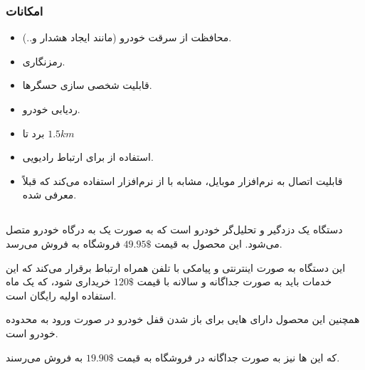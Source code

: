 \documentclass[a4paper,12pt]{report}
\begin{document}
	\subsubsection{
		امکانات
	}\label{subsubsec1:subsec2:sec3:chap1}
	\begin{itemize}[nosep]\label{item1:subsec2:sec3:chap1}
		\item
		محافظت از سرقت خودرو (مانند ایجاد هشدار و..).
		\item
		رمزنگاری.
		\item
		قابلیت شخصی سازی حسگر‌ها.
		\item
		ردیابی خودرو.
		\item
		برد
		تا
		$1.5 km$
		\item
		استفاده از
		برای ارتباط رادیویی.
		\item
		قابلیت اتصال به نرم‌افزار موبایل، مشابه با
		از نرم‌افزار
		استفاده می‌کند که قبلاً معرفی شده.
	\end{itemize}

	\subsection{
	}\label{subsec3:sec3:chap1}
	دستگاه
	یک دزدگیر و تحلیل‌گر خودرو است که به صورت یک
	به درگاه
	خودرو متصل می‌شود.
	این محصول به قیمت
	$49.95\$$
	فروشگاه
	\hyperref{https://www.amazon.com/gp/product/B00U0K3Q10}{car alarm}{carlock}{}
	به فروش می‌رسد.

	این دستگاه به صورت اینترنتی و پیامکی با تلفن ‌همراه ارتباط برقرار می‌کند که این خدمات باید به صورت جداگانه و سالانه با قیمت
	$120\$$
	خریداری شود، که یک ماه استفاده اولیه رایگان است.

	همچنین این محصول دارای
	هایی برای باز شدن قفل خودرو در صورت ورود به محدوده خودرو است.

	که این
	ها نیز به صورت جداگانه در فروشگاه
	\hyperref{https://www.amazon.com/CARLOCK-TAG-Accessory-ONLY-Automatically/dp/B075F4SWZ7}{car alarm}{carlocktag}{}
	به قیمت
	$19.90\$$
	به فروش می‌رسند.
	\cite{carAlarm:online}
\end{document}
